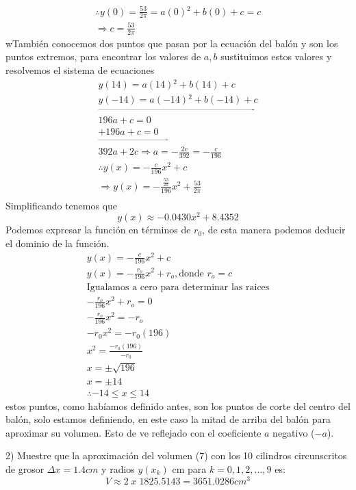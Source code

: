 \documentclass{article}
\begin{document}
\begin{gather*}
\therefore y(0)=\frac{53}{2\pi}=a(0){^2}+b(0)+c=c\\
\Rightarrow c=\frac{53}{2\pi}
\end{gather*}
wTambién conocemos dos puntos que pasan por la ecuación del balón y son los puntos extremos, para encontrar los valores de $a,b$ sustituimos estos valores y resolvemos el sistema de ecuaciones
\begin{gather*}
y(14)=a(14){^2}+b(14)+c\\
y(-14)=a(-14){^2}+b(-14)+c\\
\text{-------------------------------------------------}\\
196a+c=0\\
+196a+c=0\\
\text{----------------------}\\
392a+2c\Rightarrow a=-\frac{2c}{392}=-\frac{c}{196}\\
\therefore y(x)=-\frac{c}{196}x{^2}+c\\
\Rightarrow y(x)=-\frac{\frac{53}{2\pi}}{196}x{^2}+\frac{53}{2\pi}\\
\end{gather*}
Simplificando tenemos que $$y(x)\approx-0.0430x{^2}+8.4352$$
Podemos expresar la función en términos de $r_0$, de esta manera podemos deducir el dominio de la función.
\begin{gather*}
y(x)=-\frac{c}{196}x{^2}+c\\
y(x)=-\frac{r_{o}}{196}x{^2}+r_{o},\text{donde }r_o=c\\
\text{Igualamos a cero para determinar las raices}\\
-\frac{r_{o}}{196}x{^2}+r_{o}=0\\
-\frac{r_{o}}{196}x{^2}=-r_{o}\\
-r_{0}x{^2}=-r_{0}(196)\\
x{^2}=\frac{-r_{0}(196)}{-r_{0}}\\
x=\pm \sqrt{196}\\
x=\pm 14\\
\therefore-14\leq x\leq 14
\end{gather*}
estos puntos, como habíamos definido antes, son los puntos de corte del centro del balón, solo estamos definiendo, en este caso la mitad de arriba del balón para aproximar su volumen. Esto de ve reflejado con el coeficiente $a$ negativo ($-a$).

2) Muestre que la aproximación del volumen (7) con los 10 cilindros circunscritos de grosor $\Delta x = 1.4 cm$ y radios $y(x_{k})$ cm para $k = 0, 1, 2, . . . , 9$ es:
$$V\approx 2 \; x \;1825.5143=3651.0286 cm^3$$
\end{document}
